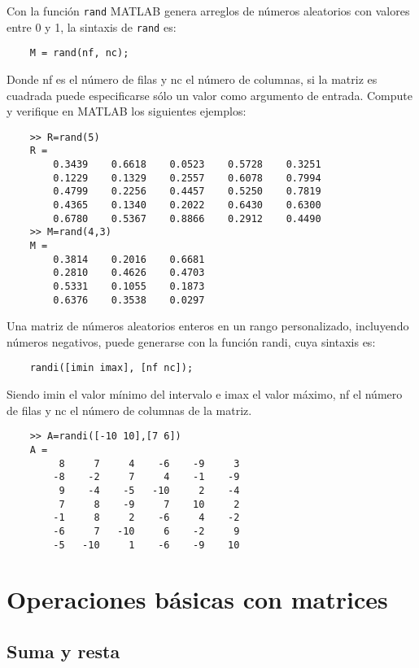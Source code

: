 Con la función \texttt{rand} MATLAB genera arreglos de números aleatorios con valores 
entre 0 y 1, la sintaxis de \texttt{rand} es:

\begin{verbatim}
	M = rand(nf, nc);
\end{verbatim}

Donde nf es el número de filas y nc el número de columnas, si la matriz es cuadrada 
puede especificarse sólo un valor como argumento de entrada. Compute y verifique en 
MATLAB los siguientes ejemplos:

\begin{verbatim}
	>> R=rand(5)
	R =
	    0.3439    0.6618    0.0523    0.5728    0.3251
	    0.1229    0.1329    0.2557    0.6078    0.7994
	    0.4799    0.2256    0.4457    0.5250    0.7819
	    0.4365    0.1340    0.2022    0.6430    0.6300
	    0.6780    0.5367    0.8866    0.2912    0.4490
	>> M=rand(4,3)
	M =
	    0.3814    0.2016    0.6681
	    0.2810    0.4626    0.4703
	    0.5331    0.1055    0.1873
	    0.6376    0.3538    0.0297
\end{verbatim}

Una matriz de números aleatorios enteros en un rango personalizado, incluyendo números 
negativos, puede generarse con la función randi, cuya sintaxis es:

\begin{verbatim}
	randi([imin imax], [nf nc]);
\end{verbatim}

Siendo imin el valor mínimo del intervalo e imax el valor máximo, nf el número de filas 
y nc el número de columnas de la matriz.

\begin{verbatim}
	>> A=randi([-10 10],[7 6])
	A =
	     8     7     4    -6    -9     3
	    -8    -2     7     4    -1    -9
	     9    -4    -5   -10     2    -4
	     7     8    -9     7    10     2
	    -1     8     2    -6     4    -2
	    -6     7   -10     6    -2     9
	    -5   -10     1    -6    -9    10
\end{verbatim}


\section{Operaciones básicas con matrices}

\subsection{Suma y resta}

